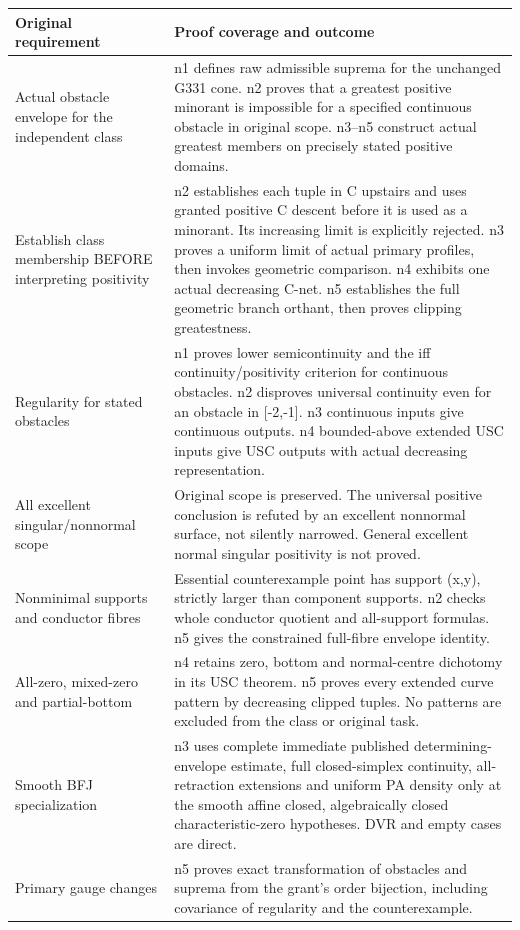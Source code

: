 \documentclass[11pt]{article}
\begin{document}
\small\begin{longtable}{p{7.10cm}p{7.10cm}}
Original requirement & Proof coverage and outcome \\
\hline
Actual obstacle envelope for the independent class & n1 defines raw admissible suprema for the unchanged G331 cone. n2 proves that a greatest positive minorant is impossible for a specified continuous obstacle in original scope. n3--n5 construct actual greatest members on precisely stated positive domains. \\
Establish class membership BEFORE interpreting positivity & n2 establishes each tuple in C upstairs and uses granted positive C descent before it is used as a minorant. Its increasing limit is explicitly rejected. n3 proves a uniform limit of actual primary profiles, then invokes geometric comparison. n4 exhibits one actual decreasing C-net. n5 establishes the full geometric branch orthant, then proves clipping greatestness. \\
Regularity for stated obstacles & n1 proves lower semicontinuity and the iff continuity/positivity criterion for continuous obstacles. n2 disproves universal continuity even for an obstacle in [-2,-1]. n3 continuous inputs give continuous outputs. n4 bounded-above extended USC inputs give USC outputs with actual decreasing representation. \\
All excellent singular/nonnormal scope & Original scope is preserved. The universal positive conclusion is refuted by an excellent nonnormal surface, not silently narrowed. General excellent normal singular positivity is not proved. \\
Nonminimal supports and conductor fibres & Essential counterexample point has support (x,y), strictly larger than component supports. n2 checks whole conductor quotient and all-support formulas. n5 gives the constrained full-fibre envelope identity. \\
All-zero, mixed-zero and partial-bottom & n4 retains zero, bottom and normal-centre dichotomy in its USC theorem. n5 proves every extended curve pattern by decreasing clipped tuples. No patterns are excluded from the class or original task. \\
Smooth BFJ specialization & n3 uses complete immediate published determining-envelope estimate, full closed-simplex continuity, all-retraction extensions and uniform PA density only at the smooth affine closed, algebraically closed characteristic-zero hypotheses. DVR and empty cases are direct. \\
Primary gauge changes & n5 proves exact transformation of obstacles and suprema from the grant's order bijection, including covariance of regularity and the counterexample. \\

\end{longtable}
\end{document}
